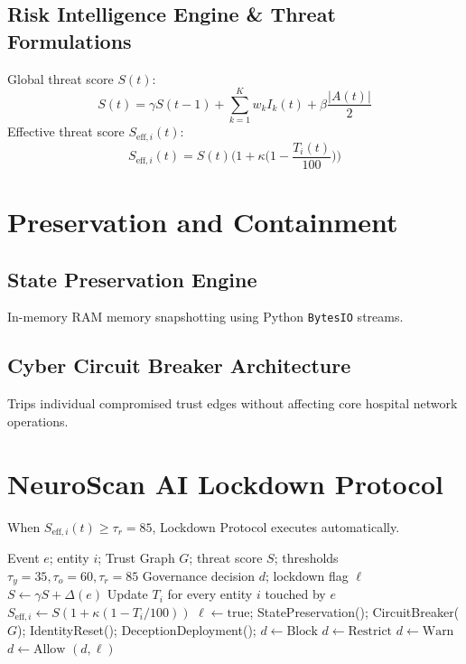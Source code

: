 \documentclass[conference]{IEEEtran}
\begin{document}
\subsection{Risk Intelligence Engine \& Threat Formulations}
Global threat score $S(t)$:
\begin{equation}
S(t) = \gamma S(t-1) + \sum_{k=1}^K w_k I_k(t) + \beta \frac{|A(t)|}{2}
\end{equation}
Effective threat score $S_{\text{eff},i}(t)$:
\begin{equation}
S_{\text{eff},i}(t) = S(t) \Big( 1 + \kappa \big( 1 - \frac{T_i(t)}{100} \big) \Big)
\end{equation}

\section{Preservation and Containment}
\subsection{State Preservation Engine}
In-memory RAM memory snapshotting using Python \texttt{BytesIO} streams.

\subsection{Cyber Circuit Breaker Architecture}
Trips individual compromised trust edges without affecting core hospital network operations.

\section{NeuroScan AI Lockdown Protocol}
When $S_{\text{eff},i}(t) \ge \tau_r = 85$, Lockdown Protocol executes automatically.

\begin{algorithm}
\caption{Continuous Observe--Govern--Preserve--Contain--Recover Protocol}
\begin{algorithmic}[1]
\REQUIRE Event $e$; entity $i$; Trust Graph $G$; threat score $S$; thresholds $\tau_y=35, \tau_o=60, \tau_r=85$
\ENSURE Governance decision $d$; lockdown flag $\ell$
\STATE $S \leftarrow \gamma S + \Delta(e)$ 
\STATE Update $T_i$ for every entity $i$ touched by $e$ 
\STATE $S_{\text{eff},i} \leftarrow S(1 + \kappa(1 - T_i/100))$ 
    \STATE $\ell \leftarrow \text{true}$; StatePreservation(); CircuitBreaker($G$); IdentityReset(); DeceptionDeployment(); $d \leftarrow \text{Block}$
    \STATE $d \leftarrow \text{Restrict}$
    \STATE $d \leftarrow \text{Warn}$
\ELSE
    \STATE $d \leftarrow \text{Allow}$
\ENDIF
\RETURN $(d, \ell)$
\end{algorithmic}
\end{algorithm}
\end{document}
